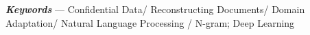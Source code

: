 

\medskip

\textbf{\emph{Keywords}} --- Confidential Data/ Reconstructing Documents/ Domain Adaptation/ Natural Language Processing  / N-gram; Deep Learning